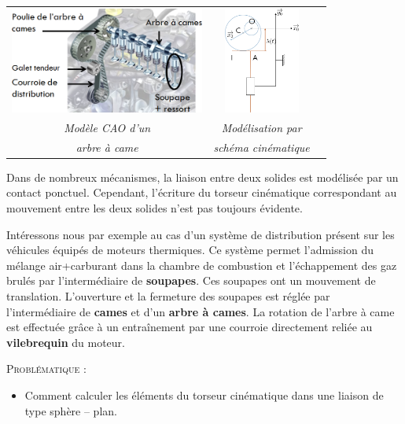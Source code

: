 \documentclass[11pt,oneside]{article}
\begin{document}
\begin{center}
\begin{tabular}{ccc}
\includegraphics[height=3.5cm]{png/fig1} &
\includegraphics[height=3.5cm]{png/fig2}\\
\textit{Modèle CAO d'un} & \textit{Modélisation par}\\
 \textit{arbre à came} & \textit{schéma cinématique}\\
\end{tabular}
\end{center}

\vspace{.2cm}
Dans de nombreux mécanismes, la liaison entre deux solides est modélisée par un contact ponctuel. Cependant, l'écriture du torseur cinématique correspondant au mouvement entre les deux solides n'est pas toujours évidente. 

Intéressons nous par exemple au cas d'un système de distribution présent sur les véhicules équipés de moteurs thermiques. Ce système permet l'admission du mélange air+carburant dans la chambre de combustion et l'échappement des gaz brulés par l'intermédiaire de \textbf{soupapes}. Ces soupapes ont un mouvement de translation. L'ouverture et la fermeture des soupapes est réglée par l'intermédiaire de \textbf{cames} et d'un \textbf{arbre à cames}. La rotation de l'arbre à came est effectuée grâce à un entraînement par une courroie directement reliée au \textbf{vilebrequin} du moteur. 


\begin{prob}
\textsc{Problématique :}
\begin{itemize}
\item Comment calculer les éléments du torseur cinématique dans une liaison de type sphère -- plan.
\end{itemize}
\end{prob}
\end{document}
